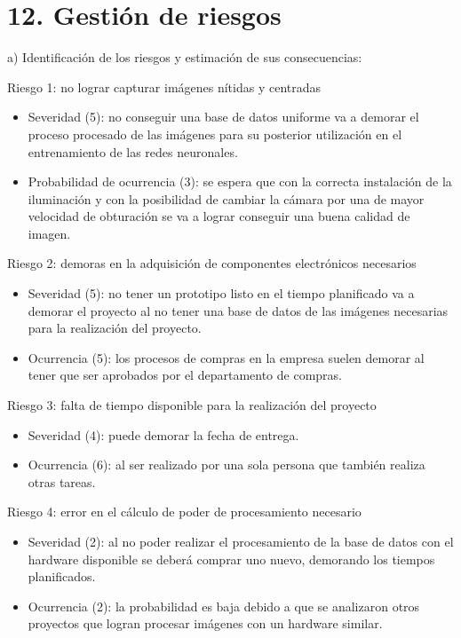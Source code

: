 \documentclass[11pt]{charter}
\begin{document}



\section{12. Gestión de riesgos}
\label{sec:riesgos}

a) Identificación de los riesgos y estimación de sus consecuencias:

Riesgo 1: no lograr capturar imágenes nítidas y centradas
\begin{itemize}
\item Severidad (5): no conseguir una base de datos uniforme va a demorar el proceso procesado de las imágenes para su posterior utilización en el entrenamiento de las redes neuronales.
\item Probabilidad de ocurrencia (3): se espera que con la correcta instalación de la iluminación y con la posibilidad de cambiar la cámara por una de mayor velocidad de obturación se va a lograr conseguir una buena calidad de imagen.  
\end{itemize}   

Riesgo 2: demoras en la adquisición de componentes electrónicos necesarios
\begin{itemize}
\item Severidad (5): no tener un prototipo listo en el tiempo planificado va a demorar el proyecto al no tener una base de datos de las imágenes necesarias para la realización del proyecto. 
\item Ocurrencia (5): los procesos de compras en la empresa suelen demorar al tener que ser aprobados por el departamento de compras.
\end{itemize}

Riesgo 3: falta de tiempo disponible para la realización del proyecto

\begin{itemize}
\item Severidad (4): puede demorar la fecha de entrega.
\item Ocurrencia (6): al ser realizado por una sola persona que también realiza otras tareas.
\end{itemize}

Riesgo 4: error en el cálculo de poder de procesamiento necesario
\begin{itemize}
\item Severidad (2): al no poder realizar el procesamiento de la base de datos con el hardware disponible se deberá comprar uno nuevo, demorando los tiempos planificados.  
\item Ocurrencia (2): la probabilidad es baja debido a que se analizaron otros proyectos que logran procesar imágenes con un hardware similar. 
\end{itemize}
\end{document}
